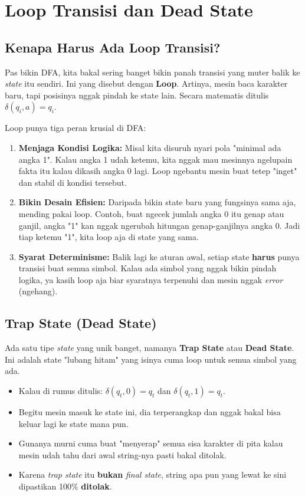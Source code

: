 \documentclass[12pt,a4paper]{article}
\begin{document}
\newpage
\section{Loop Transisi dan Dead State}

\subsection{Kenapa Harus Ada Loop Transisi?}
Pas bikin DFA, kita bakal sering banget bikin panah transisi yang muter balik ke \textit{state} itu sendiri. Ini yang disebut dengan \textbf{Loop}. Artinya, mesin baca karakter baru, tapi posisinya nggak pindah ke state lain. Secara matematis ditulis $\delta(q_i, a) = q_i$.

Loop punya tiga peran krusial di DFA:
\begin{enumerate}
    \item \textbf{Menjaga Kondisi Logika:} Misal kita disuruh nyari pola "minimal ada angka 1". Kalau angka 1 udah ketemu, kita nggak mau mesinnya ngelupain fakta itu kalau dikasih angka 0 lagi. Loop ngebantu mesin buat tetep "inget" dan stabil di kondisi tersebut.
    \item \textbf{Bikin Desain Efisien:} Daripada bikin state baru yang fungsinya sama aja, mending pakai loop. Contoh, buat ngecek jumlah angka 0 itu genap atau ganjil, angka "1" kan nggak ngerubah hitungan genap-ganjilnya angka 0. Jadi tiap ketemu "1", kita loop aja di state yang sama.
    \item \textbf{Syarat Determinisme:} Balik lagi ke aturan awal, setiap state \textbf{harus} punya transisi buat semua simbol. Kalau ada simbol yang nggak bikin pindah logika, ya kasih loop aja biar syaratnya terpenuhi dan mesin nggak \textit{error} (ngehang).
\end{enumerate}

\subsection{Trap State (Dead State)}
Ada satu tipe \textit{state} yang unik banget, namanya \textbf{Trap State} atau \textbf{Dead State}. Ini adalah state "lubang hitam" yang isinya cuma loop untuk semua simbol yang ada.
\begin{itemize}
    \item Kalau di rumus ditulis: $\delta(q_t, 0) = q_t$ dan $\delta(q_t, 1) = q_t$.
    \item Begitu mesin masuk ke state ini, dia terperangkap dan nggak bakal bisa keluar lagi ke state mana pun.
    \item Gunanya murni cuma buat "menyerap" semua sisa karakter di pita kalau mesin udah tahu dari awal string-nya pasti bakal ditolak.
    \item Karena \textit{trap state} itu \textbf{bukan} \textit{final state}, string apa pun yang lewat ke sini dipastikan 100\% \textbf{ditolak}.
\end{itemize}
\end{document}
